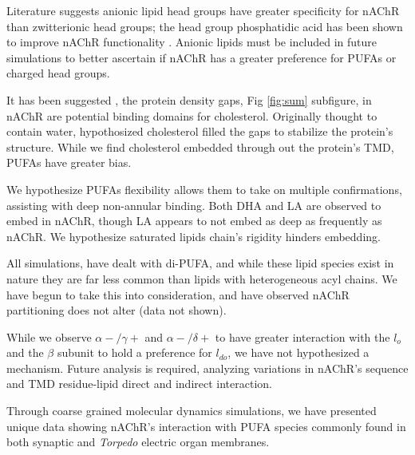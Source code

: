 Literature suggests anionic lipid head groups have greater specificity for nAChR than zwitterionic head groups; the head group phosphatidic acid has been shown to improve nAChR functionality \cite{Butler_FTIR_1993,Bhushan_Correlation_1993,Fong_Stabilization_1987,Bednarczyk_Transmembrane_2002,Corrie_Lipid_2002}. Anionic lipids must be included in future simulations to better ascertain if nAChR has a greater preference for PUFAs or charged head groups.%


It has been suggested \cite{Brannigan_Embedded_2008}, the protein density gaps, Fig \ref{fig:sum} subfigure, in nAChR are potential binding domains for cholesterol. Originally thought to contain water, \cite{Brannigan_Embedded_2008} hypothosized cholesterol filled the gaps to stabilize the protein's structure. While we find cholesterol embedded through out the protein's TMD, PUFAs have greater bias. 

We hypothesize PUFAs flexibility allows them to take on multiple confirmations, assisting with deep non-annular binding. Both DHA and LA are observed to embed in nAChR, though LA appears to not embed as deep as frequently as nAChR. We hypothesize saturated lipids chain's rigidity hinders embedding. 

All simulations, have dealt with di-PUFA, and while these lipid species exist in nature they are far less common than lipids with heterogeneous acyl chains. We have begun to take this into consideration, and have observed nAChR partitioning does not alter (data not shown).  

While we observe $\alpha-/\gamma+$ and $\alpha-/\delta+$ to have greater interaction with the $l_o$ and the $\beta$ subunit to hold a preference for $l_{do}$, we have not hypothesized a mechanism. Future analysis is required, analyzing variations in nAChR's sequence and TMD residue-lipid direct and indirect interaction.

Through coarse grained molecular dynamics simulations, we have presented unique data showing nAChR's interaction with PUFA species commonly found in both synaptic and \textit{Torpedo} electric organ membranes.  

